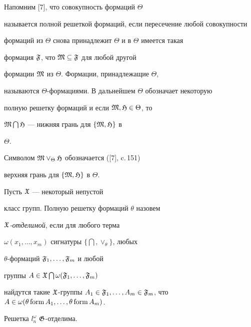 Напомним [7], что совокупность формаций $\Theta$


называется полной решеткой формаций, если пересечение любой совокупности


формаций из $\Theta$ снова принадлежит $\Theta$ и в $\Theta$ имеется такая


формация $\frak{F}$, что $\frak{M}\subseteq\frak{F}$ для любой другой


формации $\frak{M}$ из $\Theta$. Формации, принадлежащие $\Theta$,


называются $\Theta$-формациями. В дальнейшем $\Theta$ обозначает некоторую


полную решетку формаций и если $\frak{M},\frak{H}\in\Theta$, то


$\frak{M}\bigcap\frak{H}$ --- нижняя грань для $\{\frak{M},\frak{H}\}$ в


$\Theta$.


Символом $\frak{M}\vee_{\Theta}\frak{H}$ обозначается ([7], c.\,151)


верхняя грань для $\{\frak{M},\frak{H}\}$ в $\Theta$.





Пусть $\frak{X}$ --- некоторый непустой


класс групп. Полную решетку формаций $\theta$ назовем


{\it $\frak{X}$-отделимой}, если для любого терма


$\omega (x_1,\dotsc, x_m)$ сигнатуры $\{\bigcap,\vee_{\theta}\}$, любых


$\theta$-формаций $\frak{F}_1,\dotsc, \frak{F}_m$ и любой


группы $A\in\frak{X}\bigcap\omega(\frak{F}_1,\dotsc,\frak{F}_m)$


найдутся такие $\frak{X}$-группы $A_1\in\frak{F}_1,\dotsc,


A_m\in\frak{F}_m$, что $A\in\omega(\theta\form A_1, \dotsc,\theta\form A_m)$.





\begin{lem}


Решетка $l^{\omega}_n$ $\frak{G}$-отделима.


\end{lem}





